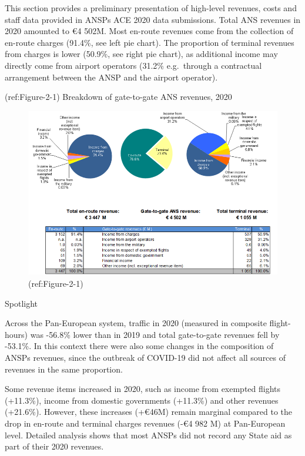 \documentclass[
]{book}
\begin{document}
This section provides a preliminary presentation of high-level revenues,
costs and staff data provided in ANSPs ACE 2020 data submissions. Total
ANS revenues in 2020 amounted to €4 502M. Most en-route revenues come
from the collection of en-route charges (91.4\%, see left pie chart).
The proportion of terminal revenues from charges is lower (50.9\%, see
right pie chart), as additional income may directly come from airport
operators (31.2\% e.g.~through a contractual arrangement between the
ANSP and the airport operator).

(ref:Figure-2-1) Breakdown of gate-to-gate ANS revenues, 2020

\begin{figure}

{\centering \includegraphics[width=0.8\linewidth]{figures/Figure-2-1} 

}

\caption{(ref:Figure-2-1)}\label{fig:Figure-2-1}
\end{figure}

Spotlight

Across the Pan-European system, traffic in 2020 (measured in composite
flight-hours) was -56.8\% lower than in 2019 and total gate-to-gate
revenues fell by -53.1\%. In this context there were also some changes
in the composition of ANSPs revenues, since the outbreak of COVID-19 did
not affect all sources of revenues in the same proportion.

Some revenue items increased in 2020, such as income from exempted
flights (+11.3\%), income from domestic governments (+11.3\%) and other
revenues (+21.6\%). However, these increases (+€46M) remain marginal
compared to the drop in en-route and terminal charges revenues (-€4 982
M) at Pan-European level. Detailed analysis shows that most ANSPs did
not record any State aid as part of their 2020 revenues.
\end{document}
